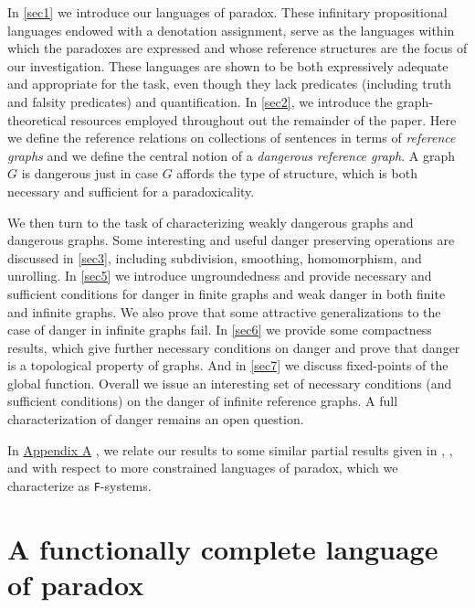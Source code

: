 \documentclass[12pt]{article}
\theoremstyle{remark}
\newcommand{\prg}{\hspace{0.25in}}
\begin{document}

\prg In \autoref{sec1} we introduce our languages of paradox. These infinitary propositional languages endowed with a denotation assignment, serve as the languages within which the paradoxes are expressed and whose reference structures are the focus of our investigation. These languages are shown to be both expressively adequate and appropriate for the task, even though they lack predicates (including truth and falsity predicates) and quantification. 
In \autoref{sec2}, we introduce the graph-theoretical resources employed throughout out the remainder of the paper. Here we define the reference relations on collections of sentences in terms of \textit{reference graphs} and we define the central notion of a \textit{dangerous reference graph}. A graph $G$ is dangerous just in case $G$ affords the type of structure, which is both necessary and sufficient for a paradoxicality. 

\prg We then turn to the task of characterizing weakly dangerous graphs and dangerous graphs. Some interesting and useful danger preserving operations are discussed in \autoref{sec3}, including subdivision, smoothing, homomorphism, and unrolling. In \autoref{sec5} we introduce ungroundedness and provide necessary and sufficient conditions for danger in finite graphs and weak danger in both finite and infinite graphs.  We also prove that some attractive generalizations to the case of danger in infinite graphs fail. In \autoref{sec6} we provide some compactness results, which give further necessary conditions on danger and prove that danger is a topological property of graphs. And in \autoref{sec7} we discuss fixed-points of the global function. Overall we issue an interesting set of necessary conditions (and sufficient conditions) on the danger of infinite reference graphs. A full characterization of danger remains an open question. 

\prg In \hyperref[app]{Appendix A} , we relate our results to some similar partial results given in \cite{yablo06}, \cite{buschlinger01}, and \cite{cook} with respect to more constrained languages of paradox, which we characterize as \texttt{F}-systems.

\section{A functionally complete language of paradox}
\label{sec1}
\end{document}
